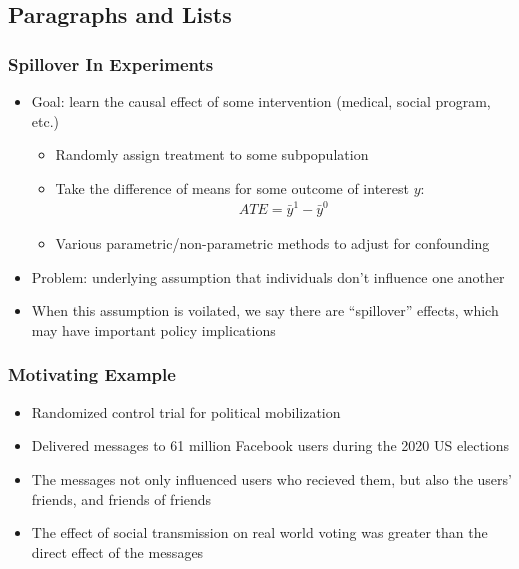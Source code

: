 \documentclass[
	11pt, %
]{beamer}
\begin{document}

\subsection{Paragraphs and Lists}

\begin{frame}
	\frametitle{Spillover In Experiments}
	\begin{itemize}
		\setlength\itemsep{1em}
		 \item Goal: learn the causal effect of some intervention (medical, social program, etc.)
		\\[1.0ex] 
		\onslide<2-> \begin{itemize}
			\setlength\itemsep{1em}
			\item Randomly assign treatment to some subpopulation
			\item Take the difference of means for some outcome of interest $y$:
			\begin{align*}
				ATE = \bar{y}^1 - \bar{y}^0
			\end{align*}
			\item Various parametric/non-parametric methods to adjust for confounding
		\end{itemize}
	\end{itemize}
	 \begin{itemize}
		\setlength\itemsep{1em}
		\item Problem: underlying assumption that individuals don't influence one another 
		\item When this assumption is voilated, we say there are ``spillover'' effects, which may have important policy implications 
	\end{itemize}
\end{frame}

\begin{frame}
	\frametitle{Motivating Example}
	\begin{itemize}
		\setlength\itemsep{1em}
		\item Randomized control trial for political mobilization 
		\item Delivered messages to 61 million Facebook users during the 2020 US elections
		\item The messages not only influenced users who recieved them, but also the users' friends, and friends of friends
		\item The effect of social transmission on real world voting was greater than the direct effect of the messages
	\end{itemize}
\end{frame}
\end{document}

